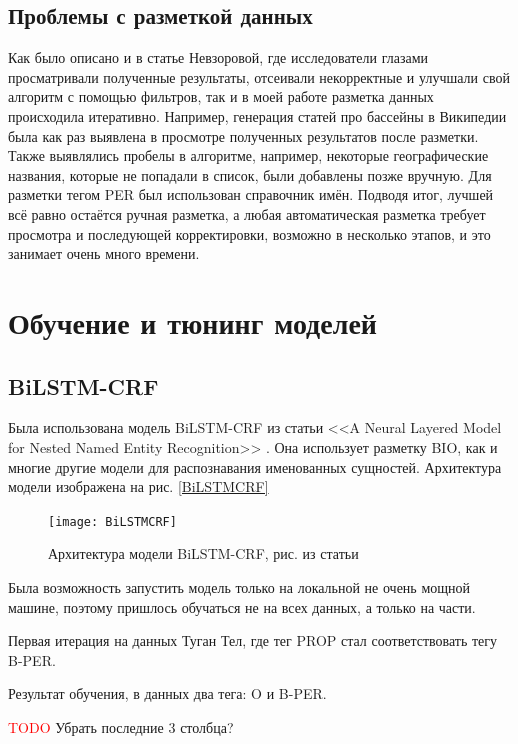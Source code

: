 \subsection{Проблемы с разметкой данных}

Как было описано и в статье Невзоровой, где исследователи глазами просматривали полученные результаты, отсеивали некорректные и улучшали свой алгоритм с помощью фильтров, так и в моей работе разметка данных происходила итеративно. Например, генерация статей про бассейны в Википедии была как раз выявлена в просмотре полученных результатов после разметки. Также выявлялись пробелы в алгоритме, например, некоторые географические названия, которые не попадали в список, были добавлены позже вручную. Для разметки тегом PER был использован справочник имён. Подводя итог, лучшей всё равно остаётся ручная разметка, а любая автоматическая разметка требует просмотра и последующей корректировки, возможно в несколько этапов, и это занимает очень много времени.

\section{Обучение и тюнинг моделей}

\subsection{BiLSTM-CRF}

Была использована модель BiLSTM-CRF из статьи <<A Neural Layered Model for Nested Named Entity Recognition>> \cite{ju-etal-2018-neural}. Она использует разметку BIO, как и многие другие модели для распознавания именованных сущностей. Архитектура модели изображена на рис. \ref{BiLSTMCRF}

\begin{figure}[H]
\caption{Архитектура модели BiLSTM-CRF, рис. из статьи \cite{ju-etal-2018-neural}}
\texttt{[image: BiLSTMCRF]}
\label{fig:BiLSTMCRF}
\end{figure}


Была возможность запустить модель только на локальной не очень мощной машине, поэтому пришлось обучаться не на всех данных, а только на части.

Первая итерация на данных Туган Тел, где тег PROP стал соответствовать тегу B-PER.

Результат обучения, в данных два тега: O и B-PER.

\textcolor{red}{TODO} Убрать последние 3 столбца?

